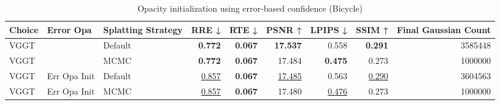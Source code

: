 \begin{table}[H]
\caption{Opacity initialization using error-based confidence (Bicycle)}
\label{tab:05_error_opa_bicycle}
\begin{tabular}{lllrrrrrr}
\toprule
Choice & Error Opa & Splatting Strategy & RRE ↓ & RTE ↓ & PSNR ↑ & LPIPS ↓ & SSIM ↑ & Final Gaussian Count \\
\midrule
VGGT &  & Default & \textbf{0.772} & \textbf{0.067} & \textbf{17.537} & 0.558 & \textbf{0.291} & 3585448 \\
VGGT &  & MCMC & \textbf{0.772} & \textbf{0.067} & 17.484 & \textbf{0.475} & 0.273 & 1000000 \\
VGGT & Err Opa Init & Default & \underline{0.857} & \textbf{0.067} & \underline{17.485} & 0.563 & \underline{0.290} & 3604563 \\
VGGT & Err Opa Init & MCMC & \underline{0.857} & \textbf{0.067} & 17.480 & \underline{0.476} & 0.273 & 1000000 \\
\bottomrule
\end{tabular}
\end{table}
